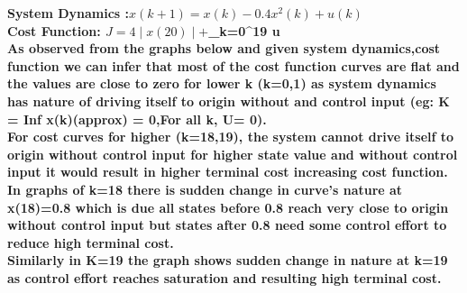 \documentclass[12pt]{article}
\begin{document}
{
\bfseries 
 System Dynamics :$x(k + 1) = x(k) - 0.4x^2 (k) + u(k)$\\ 
 Cost Function: $ J = 4 \mid x(20) \mid + $\sum_{k=0}^{19} \mid u \mid $ $ \\
 
As observed from the graphs below and given system dynamics,cost function we can infer that most of the cost function curves are flat and the values are close to zero for lower k (k=0,1) as system dynamics has nature of driving itself to origin without and control input (eg: K = Inf x(k)(approx) = 0,For all k, U= 0).\\

For cost curves for higher (k=18,19), the system cannot drive itself to origin without control input for higher state value and without control input it would result in higher terminal cost increasing cost function.\\

In graphs of k=18 there is sudden change in curve's nature at x(18)=0.8 which is due all states before 0.8 reach very close to origin without control input but states after 0.8 need some control effort to reduce high terminal cost.\\

Similarly in K=19 the graph shows sudden change in nature at k=19 as control effort reaches saturation and resulting high terminal cost.\\
}
\end{document}
